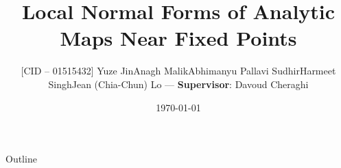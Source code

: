 \documentclass[9pt]{beamer}
\title{Local Normal Forms of Analytic Maps Near Fixed Points}
\author{
    [CID -- 01515432] Yuze Jin\newline 
    [CID -- 01514289] Anagh Malik\newline 
    [CID -- 01492068] Abhimanyu Pallavi Sudhir\newline
    [CID -- 01520955] Harmeet Singh\newline
    [CID -- 01227888] Jean (Chia-Chun) Lo\newline 
    {---}\newline
    \textbf{Supervisor}: Davoud Cheraghi}
\institute{Imperial College London}
\date{\today}
\theoremstyle{definition}
\theoremstyle{plain}
\theoremstyle{remark}
\begin{document}
\titleframe
\begin{frame}{Outline}
\tableofcontents
\end{frame}







\end{document}
